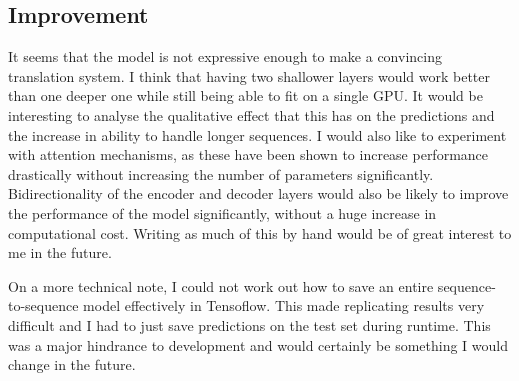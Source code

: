 \documentclass[]{article}
\begin{document}
\subsection{Improvement}
It seems that the model is not expressive enough to make a convincing translation system. I think that having two shallower layers would work better than one deeper one while still being able to fit on a single GPU. It would be interesting to analyse the qualitative effect that this has on the predictions and the increase in ability to handle longer sequences. I would also like to experiment with attention mechanisms, as these have been shown to increase performance drastically without increasing the number of parameters significantly. Bidirectionality of the encoder and decoder layers would also be likely to improve the performance of the model significantly, without a huge increase in computational cost. Writing as much of this by hand would be of great interest to me in the future.

On a more technical note, I could not work out how to save an entire sequence-to-sequence model effectively in Tensoflow. This made replicating results very difficult and I had to just save predictions on the test set during runtime. This was a major hindrance to development and would certainly be something I would change in the future.
\end{document}

